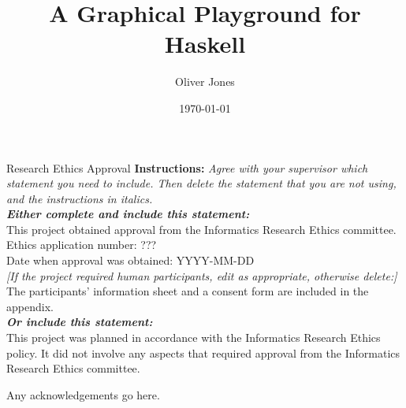 \documentclass[../main.tex]{subfiles}
\begin{document}
\begin{preliminary}

    \title{A Graphical Playground for Haskell}
    \author{Oliver Jones}
    \date{\today}


    \maketitle

    \newenvironment{ethics}{
        \begin{frontenv}{Research Ethics Approval}{\LARGE}} {
        \end{frontenv}
        \newpage}

    \begin{ethics}
        \textbf{Instructions:} \emph{Agree with your supervisor which
            statement you need to include.
            Then delete the statement that you are not using, and the instructions in
                italics.
            \\
            \textbf{Either complete and include this statement:}}\\ %
        This project obtained approval from the Informatics Research Ethics committee.
        \\
        Ethics application number: ???\\
        Date when approval was obtained: YYYY-MM-DD\\
        \emph{[If the project required human participants, edit as appropriate, otherwise delete:]}\\ %
        The participants' information sheet and a consent form are included in the
            appendix.
        \\
        \textbf{\emph{Or include this statement:}}\\ %
        This project was planned in accordance with the Informatics Research Ethics
            policy.
        It did not involve any aspects that required approval from the Informatics
            Research Ethics committee.

        \standarddeclaration
    \end{ethics}

    \begin{acknowledgements}
        Any acknowledgements go here.
    \end{acknowledgements}

    \tableofcontents
\end{preliminary}
\end{document}
